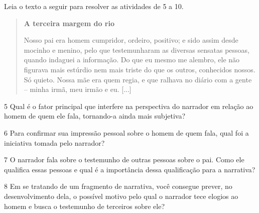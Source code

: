 
Leia o texto a seguir para resolver as atividades de 5 a 10.

\begin{quote}
\centering\textbf{A terceira margem do rio}


Nosso pai era homem cumpridor, ordeiro, positivo; e sido assim desde
mocinho e menino, pelo que testemunharam as diversas sensatas pessoas,
quando indaguei a informação. Do que eu mesmo me alembro, ele não
figurava mais estúrdio nem mais triste do que os outros, conhecidos
nossos. Só quieto. Nossa mãe era quem regia, e que ralhava no diário com
a gente -- minha irmã, meu irmão e eu. [...]

\end{quote}

\num{5} Qual é o fator principal que interfere na perspectiva do
narrador em relação ao homem de quem ele fala, tornando-a ainda mais
subjetiva?


\num{6} Para confirmar sua impressão pessoal sobre o homem de quem fala,
qual foi a iniciativa tomada pelo narrador?


\num{7} O narrador fala sobre o testemunho de outras pessoas sobre o pai. Como ele qualifica essas pessoas e qual é a importância dessa qualificação para a narrativa?


\num{8} Em se tratando de um fragmento de narrativa, você consegue
prever, no desenvolvimento dela, o possível motivo pelo qual o narrador
tece elogios ao homem e busca o testemunho de terceiros sobre ele?


